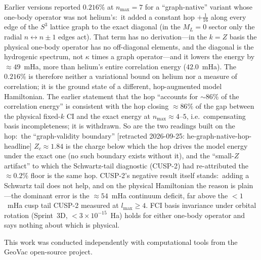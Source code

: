 \documentclass[aps,pra,twocolumn,superscriptaddress,longbibliography]{revtex4-2}
\begin{document}
Earlier versions reported $0.216\%$ at $n_{\max}=7$ for a
``graph-native'' variant whose one-body operator was not helium's:\ it
added a constant hop $+\tfrac{1}{16}$ along every edge of the $S^3$
lattice graph to the exact diagonal (in the $M_L = 0$ sector only the
radial $n \leftrightarrow n\pm1$ edges act).  That term has no
derivation---in the $k=Z$ basis the physical one-body operator has no
off-diagonal elements, and the diagonal is the hydrogenic spectrum,
not $\kappa$ times a graph operator---and it lowers the energy by
$\approx\!49$~mHa, more than helium's entire correlation energy
($42.0$~mHa).  The $0.216\%$ is therefore neither a variational bound on
helium nor a measure of correlation; it is the ground state of a
different, hop-augmented model Hamiltonian.  The earlier statement that
the hop ``accounts for $\sim$86\% of the correlation energy'' is
consistent with the hop closing $\approx 86\%$ of the gap between the
physical fixed-$k$ CI and the exact energy at $n_{\max}\approx4$--$5$,
i.e.\ compensating basis incompleteness; it is withdrawn.  So are the
two readings built on the hop:\ the ``graph-validity boundary'' [retracted 2026-09-25: he-graph-native-hop-headline]
$Z_c \approx 1.84$ is the charge below which the hop drives the model
energy under the exact one (no such boundary exists without it), and
the ``small-$Z$ artifact'' to which the Schwartz-tail diagnostic
(CUSP-2) had re-attributed the $\approx 0.2\%$ floor is the same
hop.  CUSP-2's negative result itself stands:\ adding a Schwartz tail
does not help, and on the physical Hamiltonian the reason is plain---the
dominant error is the $\approx 54$~mHa continuum deficit, far above the $< 1$~mHa cusp tail CUSP-2 measured
at $l_{\max} \ge 4$.  FCI basis invariance under orbital
rotation (Sprint~3D, $< 3\times10^{-15}$~Ha) holds for either one-body
operator and says nothing about which is physical.

\begin{acknowledgments}
This work was conducted independently with computational tools from
the GeoVac open-source project.
\end{acknowledgments}

\end{document}
